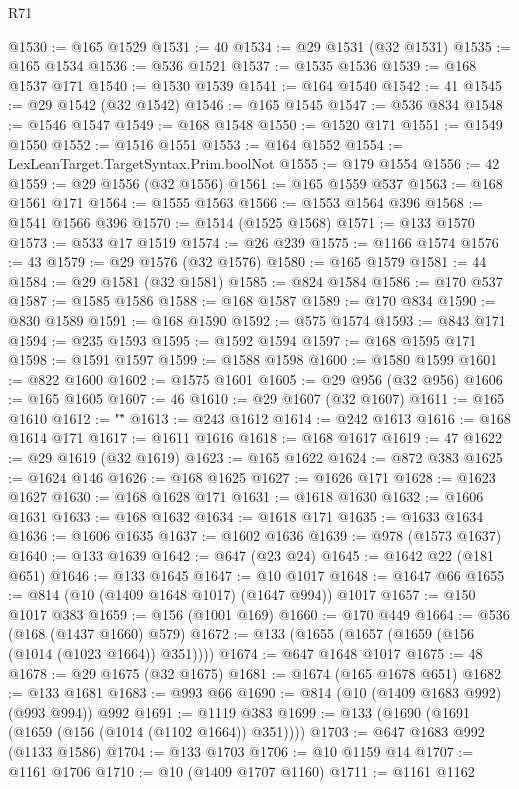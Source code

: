 \begin{lexlean}{R71}
\begin{coremodule}
@1530 := @165 @1529
@1531 := 40
@1534 := @29 @1531 (@32 @1531)
@1535 := @165 @1534
@1536 := @536 @1521
@1537 := @1535 @1536
@1539 := @168 @1537 @171
@1540 := @1530 @1539
@1541 := @164 @1540
@1542 := 41
@1545 := @29 @1542 (@32 @1542)
@1546 := @165 @1545
@1547 := @536 @834
@1548 := @1546 @1547
@1549 := @168 @1548
@1550 := @1520 @171
@1551 := @1549 @1550
@1552 := @1516 @1551
@1553 := @164 @1552
@1554 := LexLeanTarget.TargetSyntax.Prim.boolNot
@1555 := @179 @1554
@1556 := 42
@1559 := @29 @1556 (@32 @1556)
@1561 := @165 @1559 @537
@1563 := @168 @1561 @171
@1564 := @1555 @1563
@1566 := @1553 @1564 @396
@1568 := @1541 @1566 @396
@1570 := @1514 (@1525 @1568)
@1571 := @133 @1570
@1573 := @533 @17 @1519
@1574 := @26 @239
@1575 := @1166 @1574
@1576 := 43
@1579 := @29 @1576 (@32 @1576)
@1580 := @165 @1579
@1581 := 44
@1584 := @29 @1581 (@32 @1581)
@1585 := @824 @1584
@1586 := @170 @537
@1587 := @1585 @1586
@1588 := @168 @1587
@1589 := @170 @834
@1590 := @830 @1589
@1591 := @168 @1590
@1592 := @575 @1574
@1593 := @843 @171
@1594 := @235 @1593
@1595 := @1592 @1594
@1597 := @168 @1595 @171
@1598 := @1591 @1597
@1599 := @1588 @1598
@1600 := @1580 @1599
@1601 := @822 @1600
@1602 := @1575 @1601
@1605 := @29 @956 (@32 @956)
@1606 := @165 @1605
@1607 := 46
@1610 := @29 @1607 (@32 @1607)
@1611 := @165 @1610
@1612 := "\""
@1613 := @243 @1612
@1614 := @242 @1613
@1616 := @168 @1614 @171
@1617 := @1611 @1616
@1618 := @168 @1617
@1619 := 47
@1622 := @29 @1619 (@32 @1619)
@1623 := @165 @1622
@1624 := @872 @383
@1625 := @1624 @146
@1626 := @168 @1625
@1627 := @1626 @171
@1628 := @1623 @1627
@1630 := @168 @1628 @171
@1631 := @1618 @1630
@1632 := @1606 @1631
@1633 := @168 @1632
@1634 := @1618 @171
@1635 := @1633 @1634
@1636 := @1606 @1635
@1637 := @1602 @1636
@1639 := @978 (@1573 @1637)
@1640 := @133 @1639
@1642 := @647 (@23 @24)
@1645 := @1642 @22 (@181 @651)
@1646 := @133 @1645
@1647 := @10 @1017
@1648 := @1647 @66
@1655 := @814 (@10 (@1409 @1648 @1017) (@1647 @994)) @1017
@1657 := @150 @1017 @383
@1659 := @156 (@1001 @169)
@1660 := @170 @449
@1664 := @536 (@168 (@1437 @1660) @579)
@1672 := @133 (@1655 (@1657 (@1659 (@156 (@1014 (@1023 @1664)) @351))))
@1674 := @647 @1648 @1017
@1675 := 48
@1678 := @29 @1675 (@32 @1675)
@1681 := @1674 (@165 @1678 @651)
@1682 := @133 @1681
@1683 := @993 @66
@1690 := @814 (@10 (@1409 @1683 @992) (@993 @994)) @992
@1691 := @1119 @383
@1699 := @133 (@1690 (@1691 (@1659 (@156 (@1014 (@1102 @1664)) @351))))
@1703 := @647 @1683 @992 (@1133 @1586)
@1704 := @133 @1703
@1706 := @10 @1159 @14
@1707 := @1161 @1706
@1710 := @10 (@1409 @1707 @1160)
@1711 := @1161 @1162

\end{coremodule}
\end{lexlean}
